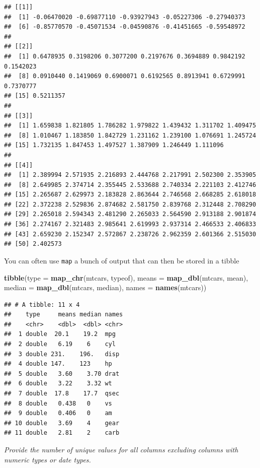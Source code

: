 \documentclass[]{book}
\newenvironment{Shaded}{\begin{snugshade}}{\end{snugshade}}
\newcommand{\DataTypeTok}[1]{\textcolor[rgb]{0.13,0.29,0.53}{#1}}
\newcommand{\KeywordTok}[1]{\textcolor[rgb]{0.13,0.29,0.53}{\textbf{#1}}}
\newcommand{\NormalTok}[1]{#1}
\theoremstyle{definition}
\theoremstyle{definition}
\theoremstyle{definition}
\theoremstyle{remark}
\begin{document}
\begin{verbatim}
## [[1]]
##  [1] -0.06470020 -0.69877110 -0.93927943 -0.05227306 -0.27940373
##  [6] -0.85770570 -0.45071534 -0.04590876 -0.41451665 -0.59548972
## 
## [[2]]
##  [1] 0.6478935 0.3198206 0.3077200 0.2197676 0.3694889 0.9842192 0.1542023
##  [8] 0.0910440 0.1419069 0.6900071 0.6192565 0.8913941 0.6729991 0.7370777
## [15] 0.5211357
## 
## [[3]]
##  [1] 1.659838 1.821805 1.786282 1.979822 1.439432 1.311702 1.409475
##  [8] 1.010467 1.183850 1.842729 1.231162 1.239100 1.076691 1.245724
## [15] 1.732135 1.847453 1.497527 1.387909 1.246449 1.111096
## 
## [[4]]
##  [1] 2.389994 2.571935 2.216893 2.444768 2.217991 2.502300 2.353905
##  [8] 2.649985 2.374714 2.355445 2.533688 2.740334 2.221103 2.412746
## [15] 2.265687 2.629973 2.183828 2.863644 2.746568 2.668285 2.618018
## [22] 2.372238 2.529836 2.874682 2.581750 2.839768 2.312448 2.708290
## [29] 2.265018 2.594343 2.481290 2.265033 2.564590 2.913188 2.901874
## [36] 2.274167 2.321483 2.985641 2.619993 2.937314 2.466533 2.406833
## [43] 2.659230 2.152347 2.572867 2.238726 2.962359 2.601366 2.515030
## [50] 2.402573
\end{verbatim}

You can often use \texttt{map} a bunch of output that can then be stored
in a tibble

\begin{Shaded}
\begin{Highlighting}[]
\KeywordTok{tibble}\NormalTok{(}\DataTypeTok{type =} \KeywordTok{map_chr}\NormalTok{(mtcars, typeof),}
       \DataTypeTok{means =} \KeywordTok{map_dbl}\NormalTok{(mtcars, mean),}
       \DataTypeTok{median =} \KeywordTok{map_dbl}\NormalTok{(mtcars, median),}
       \DataTypeTok{names =} \KeywordTok{names}\NormalTok{(mtcars))}
\end{Highlighting}
\end{Shaded}

\begin{verbatim}
## # A tibble: 11 x 4
##    type     means median names
##    <chr>    <dbl>  <dbl> <chr>
##  1 double  20.1    19.2  mpg  
##  2 double   6.19    6    cyl  
##  3 double 231.    196.   disp 
##  4 double 147.    123    hp   
##  5 double   3.60    3.70 drat 
##  6 double   3.22    3.32 wt   
##  7 double  17.8    17.7  qsec 
##  8 double   0.438   0    vs   
##  9 double   0.406   0    am   
## 10 double   3.69    4    gear 
## 11 double   2.81    2    carb
\end{verbatim}

\emph{Provide the number of unique values for all columns excluding
columns with numeric types or date types.}
\end{document}

